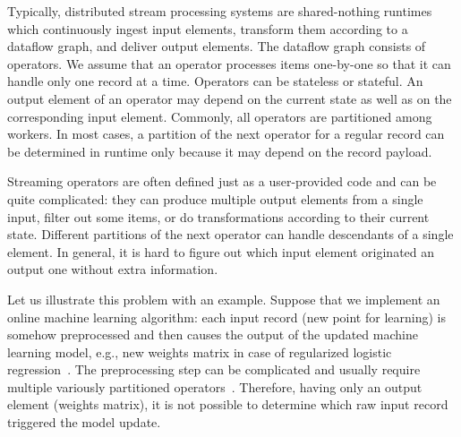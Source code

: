 \label {fs-acker-motivation}

Typically, distributed stream processing systems are shared-nothing runtimes which continuously ingest input elements, transform them according to a dataflow graph, and deliver output elements. The dataflow graph consists of operators. We assume that an operator processes items one-by-one so that it can handle only one record at a time. Operators can be stateless or stateful. An output element of an operator may depend on the current state as well as on the corresponding input element. Commonly, all operators are partitioned among workers. In most cases, a partition of the next operator for a regular record can be determined in runtime only because it may depend on the record payload. 

Streaming operators are often defined just as a user-provided code and can be quite complicated: they can produce multiple output elements from a single input, filter out some items, or do transformations according to their current state. Different partitions of the next operator can handle descendants of a single element. In general, it is hard to figure out which input element originated an output one without extra information.

Let us illustrate this problem with an example. Suppose that we implement an online machine learning algorithm: each input record (new point for learning) is somehow preprocessed and then causes the output of the updated machine learning model, e.g., new weights matrix in case of regularized logistic regression~\cite{mcmahan2013ad}. The preprocessing step can be complicated and usually require multiple variously partitioned operators~\cite{morales2015samoa}. Therefore, having only an output element (weights matrix), it is not possible to determine which raw input record triggered the model update.  

